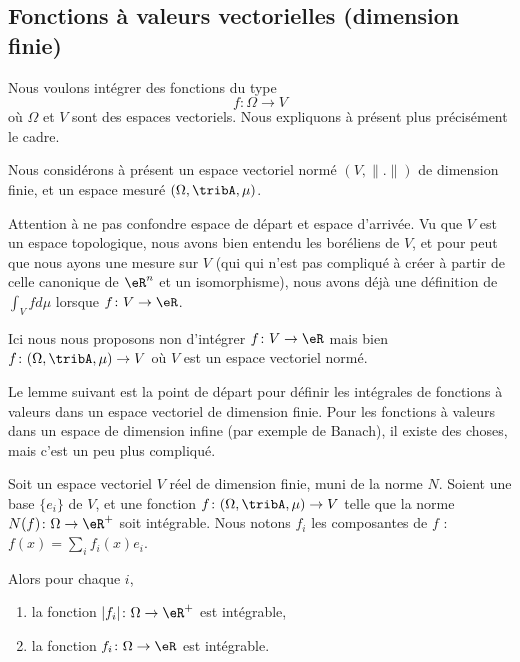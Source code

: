 \subsection{Fonctions à valeurs vectorielles (dimension finie)}

Nous voulons intégrer des fonctions du type
\begin{equation}
    f \colon \Omega\to V
\end{equation}
où \( \Omega\) et \( V\) sont des espaces vectoriels. Nous expliquons à présent plus précisément le cadre.

\begin{normaltext}      \label{NORMooTQBIooBaScjt}
    Nous considérons à présent un espace vectoriel normé \( (V,\| . \|)\) de dimension finie, et un espace mesuré \( (\Omega,\tribA,\mu)\).

    Attention à ne pas confondre espace de départ et espace d'arrivée. Vu que \( V\) est un espace topologique, nous avons bien entendu les boréliens de \( V\), et pour peut que nous ayons une mesure sur \( V\) (qui qui n'est pas compliqué à créer à partir de celle canonique de \( \eR^n\) et un isomorphisme), nous avons déjà une définition de \( \int_Vfd\mu\) lorsque \( f\colon V\to \eR\).

    Ici nous nous proposons non d'intégrer \( f\colon V\to \eR\) mais bien \( f\colon (\Omega,\tribA,\mu)\to V\) où \( V\) est un espace vectoriel normé.

    Le lemme suivant est la point de départ pour définir les intégrales de fonctions à valeurs dans un espace vectoriel de dimension finie. Pour les fonctions à valeurs dans un espace de dimension infine (par exemple de Banach), il existe des choses, mais c'est un peu plus compliqué.
\end{normaltext}

\begin{lemma}        \label{LEMooCVHDooLJASAs}
    Soit un espace vectoriel \( V\) réel de dimension finie, muni de la norme \( N\). Soient une base \( \{ e_i \}\) de \( V\), et une fonction \( f\colon (\Omega,\tribA,\mu)\to V\) telle que la norme \( N(f)\colon \Omega\to \eR^+\) soit intégrable. Nous notons \( f_i\) les composantes de \( f\) : \( f(x)=\sum_if_i(x)e_i\).

    Alors pour chaque \( i\),
    \begin{enumerate}
        \item
            la fonction \( | f_i |\colon \Omega\to \eR^+\) est intégrable,
        \item
            la fonction \( f_i\colon \Omega\to \eR\) est intégrable.
    \end{enumerate}
\end{lemma}

